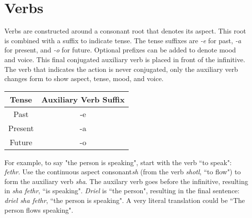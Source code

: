 \section*{Verbs}

Verbs are constructed around a consonant root that denotes its aspect. This root is combined with a suffix to indicate tense. The tense suffixes are \textit{-e} for past,\textit{ -a} for present, and \textit{-o} for future. Optional prefixes can be added to denote mood and voice. This final conjugated auxiliary verb is placed in front of the infinitive. The verb that indicates the action is never conjugated, only the auxiliary verb changes form to show aspect, tense, mood, and voice.

\begin{table}[H]
    \centering
    \begin{tabular}{|c|c|}
        \hline
        \textbf{Tense} & \textbf{Auxiliary Verb Suffix} \\
        \hline
        Past & -e \\
        Present & -a \\
        Future & -o \\
        \hline
    \end{tabular}
    \label{tab:verb-tense}
\end{table}


For example, to say "the person is speaking", start with the verb ``to speak": \textit{fethr}. Use the continuous aspect consonant\textit{sh} (from the verb \textit{shotl}, ``to flow") to form the auxiliary verb \textit{sha}. The auxilary verb goes before the infinitive, resulting in \textit{sha fethr}, ``is speaking". \textit{Driel} is ``the person", resulting in the final sentence: \textit{driel sha fethr}, ``the person is speaking". A very literal translation could be ``The person flows speaking".

